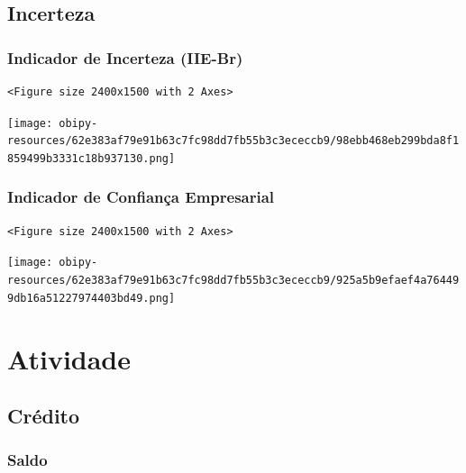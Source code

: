 \documentclass[11pt]{article}
\begin{document}
\subsection{Incerteza}
\label{sec:org47df873}



\subsubsection{Indicador de Incerteza (IIE-Br)}
\label{sec:org5688f53}

\begin{verbatim}
<Figure size 2400x1500 with 2 Axes>
\end{verbatim}


\begin{center}
\texttt{[image: obipy-resources/62e383af79e91b63c7fc98dd7fb55b3c3ececcb9/98ebb468eb299bda8f1859499b3331c18b937130.png]}
\end{center}


\subsubsection{Indicador de Confiança Empresarial}
\label{sec:org3ce553f}

\begin{verbatim}
<Figure size 2400x1500 with 2 Axes>
\end{verbatim}


\begin{center}
\texttt{[image: obipy-resources/62e383af79e91b63c7fc98dd7fb55b3c3ececcb9/925a5b9efaef4a764499db16a51227974403bd49.png]}
\end{center}

\section{Atividade}
\label{sec:org8420eae}

\subsection{Crédito}
\label{sec:org566d960}


\subsubsection{Saldo}
\label{sec:org37fd48d}
\end{document}
